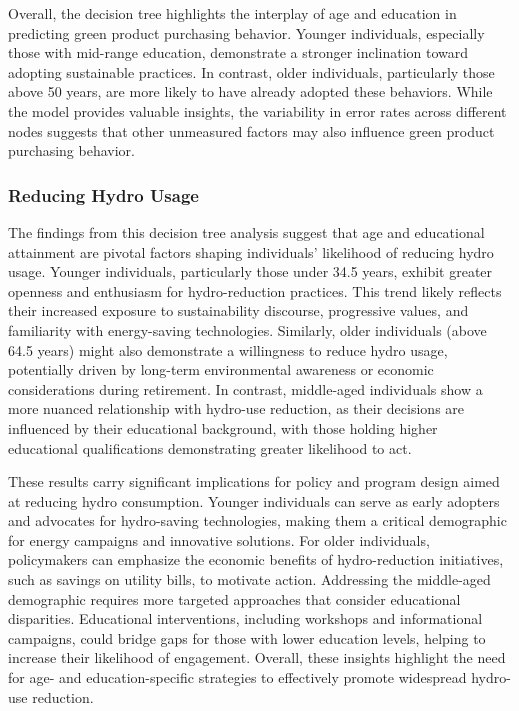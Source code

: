 \documentclass[
  letterpaper,
  DIV=11,
  numbers=noendperiod]{scrartcl}
\begin{document}
Overall, the decision tree highlights the interplay of age and education
in predicting green product purchasing behavior. Younger individuals,
especially those with mid-range education, demonstrate a stronger
inclination toward adopting sustainable practices. In contrast, older
individuals, particularly those above 50 years, are more likely to have
already adopted these behaviors. While the model provides valuable
insights, the variability in error rates across different nodes suggests
that other unmeasured factors may also influence green product
purchasing behavior.

\subsubsection{Reducing Hydro Usage}\label{reducing-hydro-usage}

The findings from this decision tree analysis suggest that age and
educational attainment are pivotal factors shaping individuals'
likelihood of reducing hydro usage. Younger individuals, particularly
those under 34.5 years, exhibit greater openness and enthusiasm for
hydro-reduction practices. This trend likely reflects their increased
exposure to sustainability discourse, progressive values, and
familiarity with energy-saving technologies. Similarly, older
individuals (above 64.5 years) might also demonstrate a willingness to
reduce hydro usage, potentially driven by long-term environmental
awareness or economic considerations during retirement. In contrast,
middle-aged individuals show a more nuanced relationship with hydro-use
reduction, as their decisions are influenced by their educational
background, with those holding higher educational qualifications
demonstrating greater likelihood to act.

These results carry significant implications for policy and program
design aimed at reducing hydro consumption. Younger individuals can
serve as early adopters and advocates for hydro-saving technologies,
making them a critical demographic for energy campaigns and innovative
solutions. For older individuals, policymakers can emphasize the
economic benefits of hydro-reduction initiatives, such as savings on
utility bills, to motivate action. Addressing the middle-aged
demographic requires more targeted approaches that consider educational
disparities. Educational interventions, including workshops and
informational campaigns, could bridge gaps for those with lower
education levels, helping to increase their likelihood of engagement.
Overall, these insights highlight the need for age- and
education-specific strategies to effectively promote widespread
hydro-use reduction.
\end{document}
